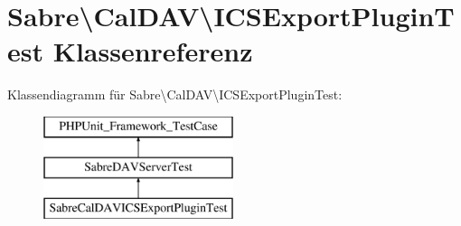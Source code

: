 \hypertarget{class_sabre_1_1_cal_d_a_v_1_1_i_c_s_export_plugin_test}{}\section{Sabre\textbackslash{}Cal\+D\+AV\textbackslash{}I\+C\+S\+Export\+Plugin\+Test Klassenreferenz}
\label{class_sabre_1_1_cal_d_a_v_1_1_i_c_s_export_plugin_test}
Klassendiagramm für Sabre\textbackslash{}Cal\+D\+AV\textbackslash{}I\+C\+S\+Export\+Plugin\+Test\+:\begin{figure}[H]
\begin{center}
\leavevmode
\includegraphics[height=3.000000cm]{class_sabre_1_1_cal_d_a_v_1_1_i_c_s_export_plugin_test}
\end{center}
\end{figure}
